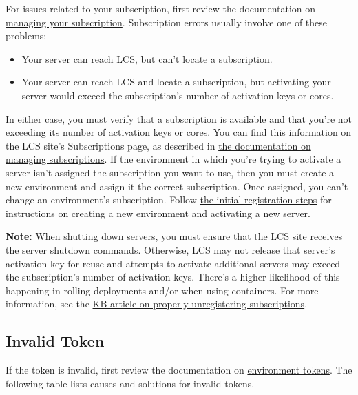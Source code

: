 For issues related to your subscription, first review the documentation
on
\href{/docs/7-0/deploy/-/knowledge_base/d/using-lcs\#managing-liferay-dxp-subscriptions}{managing
your subscription}. Subscription errors usually involve one of these
problems:

\begin{itemize}
\tightlist
\item
  Your server can reach LCS, but can't locate a subscription.
\item
  Your server can reach LCS and locate a subscription, but activating
  your server would exceed the subscription's number of activation keys
  or cores.
\end{itemize}

In either case, you must verify that a subscription is available and
that you're not exceeding its number of activation keys or cores. You
can find this information on the LCS site's Subscriptions page, as
described in
\href{/docs/7-0/deploy/-/knowledge_base/d/using-lcs\#managing-liferay-dxp-subscriptions}{the
documentation on managing subscriptions}. If the environment in which
you're trying to activate a server isn't assigned the subscription you
want to use, then you must create a new environment and assign it the
correct subscription. Once assigned, you can't change an environment's
subscription. Follow
\href{/docs/7-0/deploy/-/knowledge_base/d/registering-your-dxp-server-with-lcs}{the
initial registration steps} for instructions on creating a new
environment and activating a new server.

\noindent\hrulefill

\textbf{Note:} When shutting down servers, you must ensure that the LCS
site receives the server shutdown commands. Otherwise, LCS may not
release that server's activation key for reuse and attempts to activate
additional servers may exceed the subscription's number of activation
keys. There's a higher likelihood of this happening in rolling
deployments and/or when using containers. For more information, see the
\href{https://help.liferay.com/hc/en-us/articles/360018261011}{KB
article on properly unregistering subscriptions}.

\noindent\hrulefill

\subsection{Invalid Token}\label{invalid-token}

If the token is invalid, first review the documentation on
\href{/docs/7-0/deploy/-/knowledge_base/d/using-lcs\#using-environment-tokens}{environment
tokens}. The following table lists causes and solutions for invalid
tokens.

